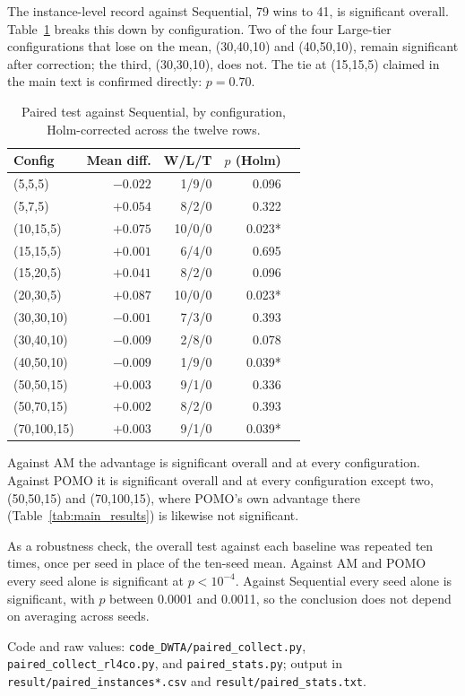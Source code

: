 The instance-level record against Sequential, 79 wins to 41, is significant
overall. Table~\ref{tab:paired-sequential} breaks this down by configuration.
Two of the four Large-tier configurations that lose on the mean,
(30,40,10) and (40,50,10), remain significant after correction; the third,
(30,30,10), does not. The tie at (15,15,5) claimed in the main text is
confirmed directly: $p=0.70$.

\begin{table}[htbp]
\centering
\small
\caption{Paired test against Sequential, by configuration, Holm-corrected
across the twelve rows.}
\label{tab:paired-sequential}
\begin{tabular}{@{}lrrrr@{}}
\toprule
Config & Mean diff. & W/L/T & $p$ (Holm) \\
\midrule
(5,5,5)      & $-0.022$ & 1/9/0  & 0.096 \\
(5,7,5)      & $+0.054$ & 8/2/0  & 0.322 \\
(10,15,5)    & $+0.075$ & 10/0/0 & 0.023* \\
(15,15,5)    & $+0.001$ & 6/4/0  & 0.695 \\
(15,20,5)    & $+0.041$ & 8/2/0  & 0.096 \\
(20,30,5)    & $+0.087$ & 10/0/0 & 0.023* \\
(30,30,10)   & $-0.001$ & 7/3/0  & 0.393 \\
(30,40,10)   & $-0.009$ & 2/8/0  & 0.078 \\
(40,50,10)   & $-0.009$ & 1/9/0  & 0.039* \\
(50,50,15)   & $+0.003$ & 9/1/0  & 0.336 \\
(50,70,15)   & $+0.002$ & 8/2/0  & 0.393 \\
(70,100,15)  & $+0.003$ & 9/1/0  & 0.039* \\
\bottomrule
\end{tabular}
\end{table}

Against AM the advantage is significant overall and at every configuration.
Against POMO it is significant overall and at every configuration except two,
(50,50,15) and (70,100,15), where POMO's own advantage there
(Table~\ref{tab:main_results}) is likewise not significant.

As a robustness check, the overall test against each baseline was repeated
ten times, once per seed in place of the ten-seed mean. Against AM and POMO
every seed alone is significant at $p<10^{-4}$. Against Sequential every seed
alone is significant, with $p$ between 0.0001 and 0.0011, so the conclusion
does not depend on averaging across seeds.

Code and raw values: \texttt{code\_DWTA/paired\_collect.py},
\texttt{paired\_collect\_rl4co.py}, and \texttt{paired\_stats.py}; output in
\texttt{result/paired\_instances*.csv} and \texttt{result/paired\_stats.txt}.
